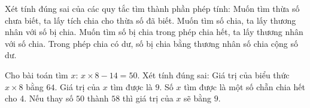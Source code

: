 \begin{ex} %
Xét tính đúng sai của các quy tắc tìm thành phần phép tính:
\choiceTF
{\True Muốn tìm thừa số chưa biết, ta lấy tích chia cho thừa số đã biết.}
{Muốn tìm số chia, ta lấy thương nhân với số bị chia.}
{\True Muốn tìm số bị chia trong phép chia hết, ta lấy thương nhân với số chia.}
{\True Trong phép chia có dư, số bị chia bằng thương nhân số chia cộng số dư.}
\end{ex}

\begin{ex} %
Cho bài toán tìm $x$: $x \times 8 - 14 = 50$. Xét tính đúng sai:
\choiceTF
{\True Giá trị của biểu thức $x \times 8$ bằng $64$.}
{Giá trị của $x$ tìm được là $9$.}
{\True Số $x$ tìm được là một số chẵn chia hết cho 4.}
{\True Nếu thay số $50$ thành $58$ thì giá trị của $x$ sẽ bằng $9$.}
\end{ex}

